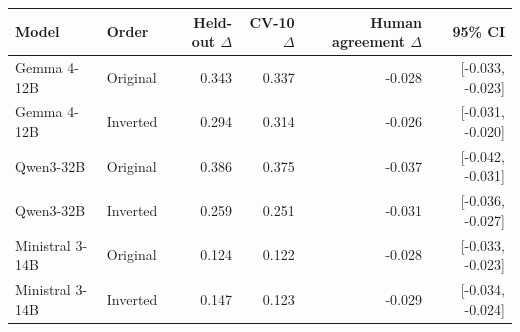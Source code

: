 \begin{tabular}{llrrrr}
\toprule
Model & Order & Held-out $\Delta$ & CV-10 $\Delta$ & Human agreement $\Delta$ & 95\% CI \\
\midrule
Gemma 4-12B & Original & 0.343 & 0.337 & -0.028 & [-0.033, -0.023] \\
Gemma 4-12B & Inverted & 0.294 & 0.314 & -0.026 & [-0.031, -0.020] \\
Qwen3-32B & Original & 0.386 & 0.375 & -0.037 & [-0.042, -0.031] \\
Qwen3-32B & Inverted & 0.259 & 0.251 & -0.031 & [-0.036, -0.027] \\
Ministral 3-14B & Original & 0.124 & 0.122 & -0.028 & [-0.033, -0.023] \\
Ministral 3-14B & Inverted & 0.147 & 0.123 & -0.029 & [-0.034, -0.024] \\
\bottomrule
\end{tabular}

